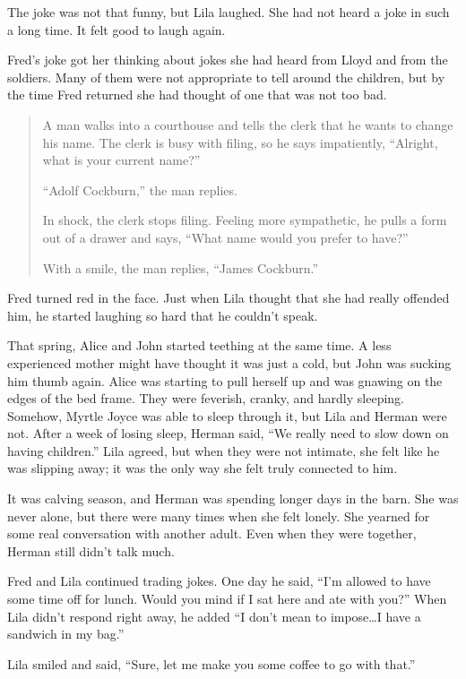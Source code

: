 \documentclass[
  letterpaper,
]{book}
\begin{document}
The joke was not that funny, but Lila laughed. She had not heard a joke
in such a long time. It felt good to laugh again.

Fred's joke got her thinking about jokes she had heard from Lloyd and
from the soldiers. Many of them were not appropriate to tell around the
children, but by the time Fred returned she had thought of one that was
not too bad.

\begin{quote}
A man walks into a courthouse and tells the clerk that he wants to
change his name. The clerk is busy with filing, so he says impatiently,
``Alright, what is your current name?''

``Adolf Cockburn,'' the man replies.

In shock, the clerk stops filing. Feeling more sympathetic, he pulls a
form out of a drawer and says, ``What name would you prefer to have?''

With a smile, the man replies, ``James Cockburn.''
\end{quote}

Fred turned red in the face. Just when Lila thought that she had really
offended him, he started laughing so hard that he couldn't speak.

That spring, Alice and John started teething at the same time. A less
experienced mother might have thought it was just a cold, but John was
sucking him thumb again. Alice was starting to pull herself up and was
gnawing on the edges of the bed frame. They were feverish, cranky, and
hardly sleeping. Somehow, Myrtle Joyce was able to sleep through it, but
Lila and Herman were not. After a week of losing sleep, Herman said,
``We really need to slow down on having children.'' Lila agreed, but
when they were not intimate, she felt like he was slipping away; it was
the only way she felt truly connected to him.

It was calving season, and Herman was spending longer days in the barn.
She was never alone, but there were many times when she felt lonely. She
yearned for some real conversation with another adult. Even when they
were together, Herman still didn't talk much.

Fred and Lila continued trading jokes. One day he said, ``I'm allowed to
have some time off for lunch. Would you mind if I sat here and ate with
you?'' When Lila didn't respond right away, he added ``I don't mean to
impose\ldots I have a sandwich in my bag.''

Lila smiled and said, ``Sure, let me make you some coffee to go with
that.''
\end{document}
